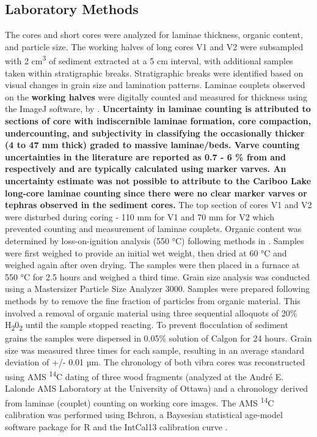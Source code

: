 \documentclass[Royal,times,doublespace,sageh]{sagej}
\begin{document}
\hypertarget{laboratory-methods}{%
\subsection{Laboratory Methods}\label{laboratory-methods}}

The cores and short cores were analyzed for laminae thickness, organic
content, and particle size. The working halves of long cores V1 and V2
were subsampled with 2 cm\textsuperscript{3} of sediment extracted at a
5 cm interval, with additional samples taken within stratigraphic
breaks. Stratigraphic breaks were identified based on visual changes in
grain size and lamination patterns. Laminae couplets observed on the
\textbf{working halves} were digitally counted and measured for
thickness using the ImageJ software, by \citet{Schneider2012}.
\textbf{Uncertainty in laminae counting is attributed to sections of
core with indiscernible laminae formation, core compaction,
undercounting, and subjectivity in classifying the occasionally thicker
(4 to 47 mm thick) graded to massive laminae/beds. Varve counting
uncertainties in the literature are reported as 0.7 - 6 \% from
\citet{Menounos2008c} and \citet{Birlo2022} respectively and are
typically calculated using marker varves. An uncertainty estimate was
not possible to attribute to the Cariboo Lake long-core laminae counting
since there were no clear marker varves or tephras observed in the
sediment cores.} The top section of cores V1 and V2 were disturbed
during coring - 110 mm for V1 and 70 mm for V2 which prevented counting
and measurement of laminae couplets. Organic content was determined by
loss-on-ignition analysis (550 °C) following methods in
\citet{Smith2003}. Samples were first weighed to provide an initial wet
weight, then dried at 60 °C and weighed again after oven drying. The
samples were then placed in a furnace at 550 °C for 2.5 hours and
weighed a third time. Grain size analysis was conducted using a
Mastersizer Particle Size Analyzer 3000. Samples were prepared following
methods by \citet{Gray2010} to remove the fine fraction of particles
from organic material. This involved a removal of organic material using
three sequential alloquots of 20\% H\textsubscript{2}0\textsubscript{2}
until the sample stopped reacting. To prevent flocculation of sediment
grains the samples were dispersed in 0.05\% solution of Calgon for 24
hours. Grain size was measured three times for each sample, resulting in
an average standard deviation of +/- 0.01 µm. The chronology of both
vibra cores was reconstructed using AMS \textsuperscript{14}C dating of
three wood fragments (analyzed at the André E. Lalonde AMS Laboratory at
the University of Ottawa) and a chronology derived from laminae
(couplet) counting on working core images. The AMS \textsuperscript{14}C
calibration was performed using Bchron, a Baysesian statistical
age-model software package for R
\citep{Parnell2008, Parnell2011, Haslett2008} and the IntCal13
calibration curve \citep{Reimer2013}.
\end{document}
